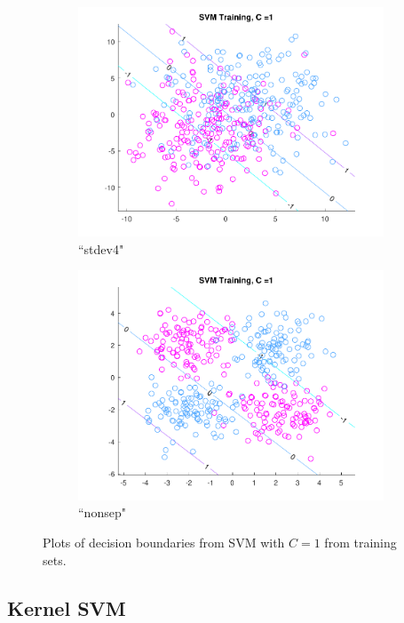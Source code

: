 \begin{figure}[h!]
\begin{subfigure}[b]{0.22\textwidth}
	\includegraphics[scale=0.4]{figures/hw2_2_stdev4_a_1.pdf}
	\caption{``stdev4"}\label{fig:svm_data_stdev4a}
    \end{subfigure} 
    \quad
    \begin{subfigure}[b]{0.22\textwidth}
	\includegraphics[scale=0.4]{figures/hw2_2_nonsep_a_1.pdf}
	\caption{``nonsep"}\label{fig:svm_data_nonsep_a}
    \end{subfigure}  
    \caption{Plots of decision boundaries from SVM with $C=1$ from training sets.}  \label{fig:SVM_plots}  
\end{figure}

\subsection{Kernel SVM}

